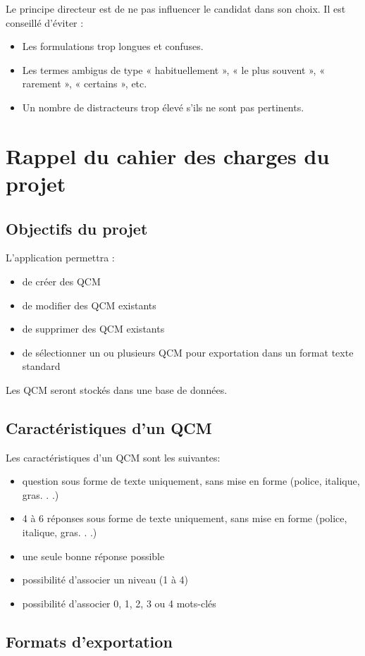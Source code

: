 \documentclass[a4paper]{article}
\begin{document}
\noindent
	 Le principe directeur est de ne pas influencer le candidat dans son choix.
	 Il est conseillé d’éviter :
	 
	\begin{itemize}
		\item Les formulations trop longues et confuses.
		\item Les termes ambigus de type « habituellement », « le plus souvent », « rarement », « certains », etc.
		\item Un nombre de distracteurs trop élevé s’ils ne sont pas pertinents.
	\end{itemize}
	
	\newpage
	\section{Rappel du cahier des charges du projet}
	\subsection{Objectifs du projet}
	L’application permettra :
	\begin{itemize}
		\item de créer des QCM
		\item de modifier des QCM existants
		\item de supprimer des QCM existants
		\item de sélectionner un ou plusieurs QCM pour exportation dans un format texte standard
	\end{itemize}
\noindent
	Les QCM seront stockés dans une base de données.
	\subsection{Caractéristiques d'un QCM}
	Les caractéristiques d'un QCM sont les suivantes: 
	\begin{itemize}
		\item question sous forme de texte uniquement, sans mise en forme (police, italique, gras. . .)
		\item 4 à 6 réponses sous forme de texte uniquement, sans mise en forme (police, italique, gras. . .)
		\item une seule bonne réponse possible
		\item possibilité d’associer un niveau (1 à 4)
		\item possibilité d’associer 0, 1, 2, 3 ou 4 mots-clés
	\end{itemize}
\newpage
	\subsection{Formats d'exportation}
\end{document}
